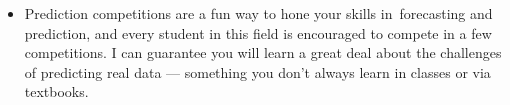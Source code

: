 \documentclass[11pt,a4paper,]{article}
\begin{document}
\begin{itemize}
\item
  Prediction competitions are a fun way to hone your skills in~forecasting and prediction, and every student in this field is encouraged to compete in a few competitions. I can guarantee you will learn a great deal about the challenges of predicting real data --- something you don't always learn in classes or via textbooks.
\end{itemize}

\printbibliography
\end{document}
